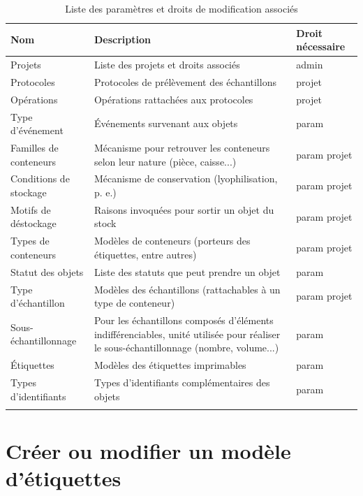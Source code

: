 \begin{longtable}{|p{4cm}|p{8cm}| p{3cm}|}
\hline
\textbf{Nom} & \textbf{Description} & \textbf{Droit nécessaire} \\
\hline
\endhead
Projets & Liste des projets et droits associés & admin \\
\hline
Protocoles & Protocoles de prélèvement des échantillons & projet \\
\hline
Opérations & Opérations rattachées aux protocoles & projet \\
\hline
Type d'événement & Événements survenant aux objets & param \\
\hline
Familles de conteneurs & Mécanisme pour retrouver les conteneurs selon leur nature (pièce, caisse...) & param projet\\
\hline
Conditions de stockage & Mécanisme de conservation (lyophilisation, p. e.) & param projet\\
\hline
Motifs de déstockage & Raisons invoquées pour sortir un objet du stock & param projet\\
\hline
Types de conteneurs & Modèles de conteneurs (porteurs des étiquettes, entre autres) & param projet\\
\hline
Statut des objets & Liste des statuts que peut prendre un objet & param\\
\hline
Type d'échantillon & Modèles des échantillons (rattachables à un type de conteneur) &  param projet\\
\hline
Sous-échantillonnage & Pour les échantillons composés d'éléments indifférenciables, unité utilisée pour réaliser le sous-échantillonnage (nombre, volume...) & param \\
\hline
Étiquettes & Modèles des étiquettes imprimables & param \\
\hline
Types d'identifiants & Types d'identifiants complémentaires des objets & param \\
\hline

\caption{Liste des paramètres et droits de modification associés}
\end{longtable}

\section{Créer ou modifier un modèle d'étiquettes}

